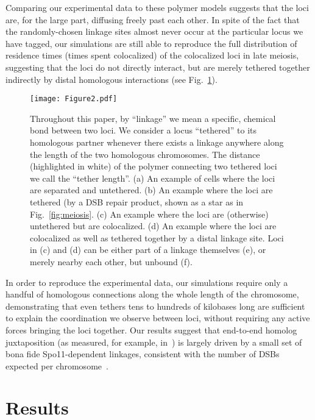 \documentclass[9pt,twocolumn,twoside,lineno]{pnas-new}
\begin{document}
Comparing our experimental data to these polymer models suggests that the loci are, for the large part, diffusing freely past each other. In spite of the fact that the randomly-chosen linkage sites almost never occur at the particular locus we have tagged, our simulations are still able to reproduce the full distribution of residence times (times spent colocalized) of the colocalized loci in late meiosis, suggesting that the loci do not directly interact, but are merely tethered together indirectly by distal homologous interactions (see Fig.~\ref{fig:tether-definition}).

\begin{figure}[t!]
    \centering
    \texttt{[image: Figure2.pdf]}


\caption{Throughout this paper, by “linkage” we mean a specific, chemical bond between two loci. We consider a locus “tethered” to its homologous partner whenever there exists a linkage anywhere along the length of the two homologous chromosomes. The distance (highlighted in white) of the polymer connecting two tethered loci we call the “tether length”. (a) An example of cells where the loci are separated and untethered. (b) An example where the loci are tethered (by a DSB repair product, shown as a star as in Fig.~\ref{fig:meiosis}. (c) An example where the loci are (otherwise) untethered but are colocalized. (d) An example where the loci are colocalized as well as tethered together by a distal linkage site. Loci in (c) and (d) can be either part of a linkage themselves (e), or merely nearby each other, but unbound (f).}\label{fig:tether-definition}
\end{figure}

In order to reproduce the experimental data, our simulations require only a handful of homologous connections along the whole length of the chromosome, demonstrating that even tethers tens to hundreds of kilobases long are sufficient to explain the coordination we observe between loci, without requiring any active forces bringing the loci together. Our results suggest that end-to-end homolog juxtaposition (as measured, for example, in~\citep{loidl1994,weiner1994}) is largely driven by a small set of bona fide Spo11-dependent linkages, consistent with the number of DSBs expected per chromosome~\cite{borde2012}.

\section*{Results}
\end{document}
